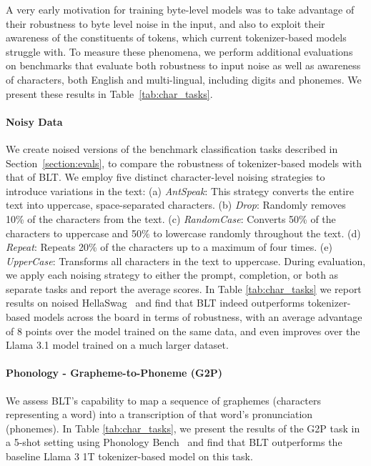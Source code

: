 A very early motivation for training byte-level models was to take advantage of their robustness to byte level noise in the input, and also to exploit their awareness of the constituents of tokens, which current tokenizer-based models struggle with. To measure these phenomena, we perform additional evaluations on benchmarks that evaluate both robustness to input noise as well as awareness of characters, both English and multi-lingual, including digits and phonemes. We present these results in Table~\ref{tab:char_tasks}.

\paragraph{Noisy Data} We create noised versions of the benchmark classification tasks described in Section~\ref{section:evals}, to compare the robustness of tokenizer-based models with that of {\textsc BLT}. We employ five distinct character-level noising strategies to introduce variations in the text: (a) \textit{AntSpeak}: This strategy converts the entire text into uppercase, space-separated characters. (b) \textit{Drop}: Randomly removes 10\% of the characters from the text. (c) \textit{RandomCase}: Converts 50\% of the characters to uppercase and 50\% to lowercase randomly throughout the text. (d) \textit{Repeat}:  Repeats 20\% of the characters up to a maximum of four times. (e) \textit{UpperCase}: Transforms all characters in the text to uppercase. During evaluation, we apply each noising strategy to either the prompt, completion, or both as separate tasks and report the average scores. In Table \ref{tab:char_tasks} we report results on noised HellaSwag~\citep{Eval_hellaswag} and find that {\textsc BLT} indeed outperforms tokenizer-based models across the board in terms of robustness, with an average advantage of 8 points over the model trained on the same data, and even improves over the Llama 3.1 model trained on a much larger dataset.

\paragraph{Phonology - Grapheme-to-Phoneme (G2P)} We assess {\textsc BLT}'s capability to map a sequence of graphemes (characters representing a word) into a transcription of that word's pronunciation (phonemes). In Table \ref{tab:char_tasks}, we present the results of the G2P task in a 5-shot setting using Phonology Bench~\citep{suvarna2024phonologybench} and find that {\textsc BLT} outperforms the baseline Llama 3 1T tokenizer-based model on this task.

